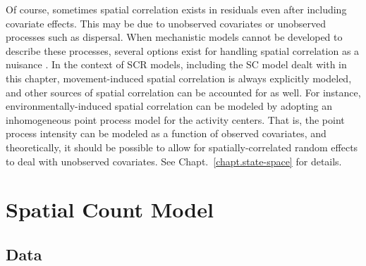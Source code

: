 Of course, sometimes spatial correlation exists in residuals even
after including covariate effects. %
This may be due to
unobserved covariates or unobserved processes such as dispersal. When
mechanistic models cannot be developed to describe these processes,
several options exist for handling spatial correlation as a nuisance
\citep{besag_kooperber:1995,zuur_etal:2009,wikle:2010}. %
In the context of SCR models, including the SC model dealt with in this
chapter, movement-induced spatial correlation is always explicitly
modeled, and other sources of spatial correlation can be accounted for
as well. For instance,
environmentally-induced spatial correlation can be modeled by adopting an
inhomogeneous point process model for the activity centers. That is,
the point process intensity can be modeled as a function of observed
covariates, and theoretically, it should be possible to allow for
spatially-correlated random effects to deal with unobserved covariates.
See Chapt.~\ref{chapt.state-space} for details.




\section{Spatial Count Model}

\subsection{Data}

